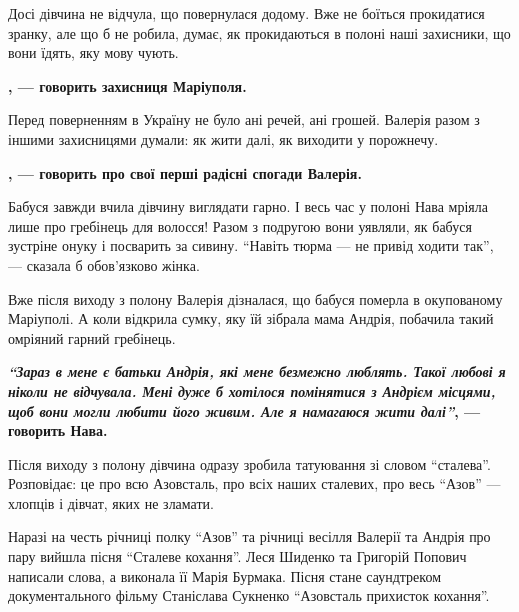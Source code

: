 Досі дівчина не відчула, що повернулася додому. Вже не боїться прокидатися
зранку, але що б не робила, думає, як прокидаються в полоні наші захисники, що
вони їдять, яку мову чують.

\begin{leftbar}
	\begingroup
		\bfseries
{}, — говорить захисниця Маріуполя.
	\endgroup
\end{leftbar}

Перед поверненням в Україну не було ані речей, ані грошей. Валерія разом з
іншими захисницями думали: як жити далі, як виходити у порожнечу.

\begin{leftbar}
	\begingroup
		\bfseries
{}, — говорить про свої перші радісні
спогади Валерія.
	\endgroup
\end{leftbar}


Бабуся завжди вчила дівчину виглядати гарно. І весь час у полоні Нава мріяла
лише про гребінець для волосся! Разом з подругою вони уявляли, як бабуся
зустріне онуку і посварить за сивину. \enquote{Навіть тюрма — не привід ходити так}, —
сказала б обов'язково жінка.

Вже після виходу з полону Валерія дізналася, що бабуся померла в окупованому
Маріуполі. А коли відкрила сумку, яку їй зібрала мама Андрія, побачила такий
омріяний гарний гребінець.

\begin{leftbar}
\bfseries
\emph{\enquote{Зараз в мене є батьки Андрія, які мене безмежно люблять. Такої любові я
ніколи не відчувала. Мені дуже б хотілося помінятися з Андрієм місцями,
щоб вони могли любити його живим. Але я намагаюся жити далі}}, —
говорить Нава.
\end{leftbar}

Після виходу з полону дівчина одразу зробила татуювання зі словом \enquote{сталева}.
Розповідає: це про всю Азовсталь, про всіх наших сталевих, про весь \enquote{Азов} —
хлопців і дівчат, яких не зламати.

Наразі на честь річниці полку \enquote{Азов} та річниці весілля Валерії та Андрія про
пару вийшла пісня \enquote{Сталеве кохання}. Леся Шиденко та Григорій Попович написали
слова, а виконала її Марія Бурмака. Пісня стане саундтреком документального
фільму Станіслава Сукненко \enquote{Азовсталь прихисток кохання}.

